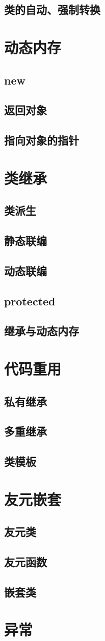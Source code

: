 \documentclass[UTF8,a4paper,12pt]{article}
\begin{document}
\subsection{类的自动、强制转换}
\newpage
\section{动态内存}
\subsection{new}
\subsection{返回对象}
\subsection{指向对象的指针}
\newpage
\section{类继承}
\subsection{类派生}
\subsection{静态联编}
\subsection{动态联编}
\subsection{protected}
\subsection{继承与动态内存}
\newpage
\section{代码重用}
\subsection{私有继承}
\subsection{多重继承}
\subsection{类模板}
\newpage
\section{友元嵌套}
\subsection{友元类}
\subsection{友元函数}
\subsection{嵌套类}
\newpage
\section{异常}
\end{document}
